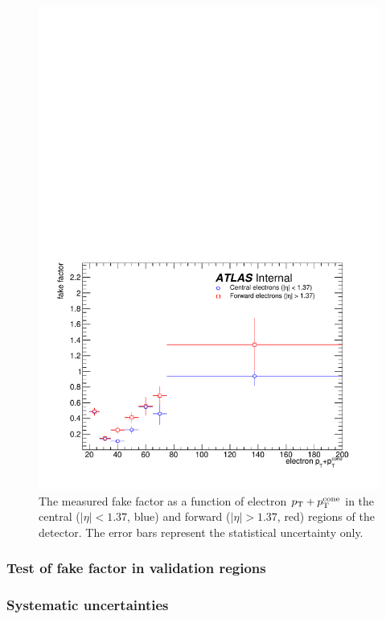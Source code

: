 \begin{figure}[htbp]
  \centering
  \includegraphics[width=.6\textwidth]{figs/ssww_13tev/backgrounds/ff/elec_ff}
  \caption{The measured fake factor as a function of electron $p_{\mathrm{T}}+p_{\mathrm{T}}^{\textrm{cone}}$ in the central ($|\eta|<1.37$, blue) and forward ($|\eta| > 1.37$, red) regions of the detector.  The error bars represent the statistical uncertainty only.}
  \label{fig:ssww13tev_ff_elec}
\end{figure}

\subsubsection{Test of fake factor in validation regions}\label{ssww13tev:ff_vr}

\subsubsection{Systematic uncertainties}\label{ssww13tev:ff_systematics}

